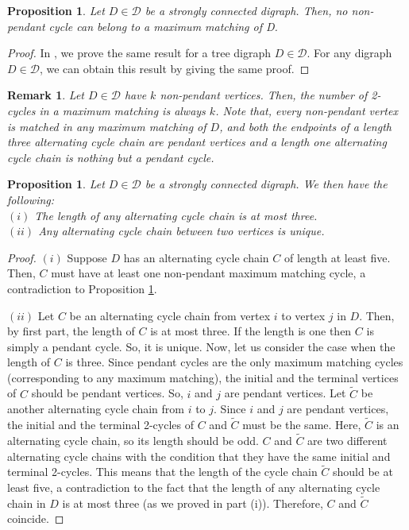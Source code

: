\documentclass[notitlepage,12pt,reqno]{amsart}
\newtheorem{prop}[thm]{Proposition}
\newtheorem{rem}[thm]{Remark}
\numberwithin{equation}{section}
\begin{document}
\begin{prop}\label{nononpendant}
Let $D\in \mathcal{D}$ be a strongly connected digraph. Then, no non-pendant cycle can belong to a maximum matching of D.
\end{prop}
\begin{proof}
In \cite[Proposition 2.2]{nandi}, we prove the same result for a tree digraph $D\in \mathcal{D}$. For any digraph $D\in \mathcal{D}$, we can obtain this result by giving the same proof.
\end{proof}
\begin{rem}\label{properties}
Let $D\in \mathcal{D}$ have $k$ non-pendant vertices. Then, the number of 2-cycles in a maximum matching is always $k$. Note that, every non-pendant vertex is matched in any maximum matching of $D$, and both the endpoints of a length three alternating cycle chain are pendant vertices and a length one alternating cycle chain is nothing but a pendant cycle.
\end{rem}
\begin{prop}\label{uniquealternating}
Let $D\in \mathcal{D}$ be a strongly connected digraph. We then have the following:\\
$(i)$ The length of any alternating cycle chain is at most three.\\
$(ii)$ Any alternating cycle chain between two vertices is unique.
\end{prop}
\begin{proof}
$(i)$ Suppose $D$ has an alternating cycle chain $C$ of length at least five. Then, $C$ must have at least one non-pendant maximum matching cycle, a contradiction to Proposition \ref{nononpendant}.

$(ii)$ Let $C$ be an alternating cycle chain from vertex $i$ to vertex $j$ in $D$. Then, by first part, the length of $C$ is at most three. If the length is one then $C$ is simply a pendant cycle. So, it is unique. Now, let us consider the case when the length of $C$ is three. Since pendant cycles are the only maximum matching cycles (corresponding to any maximum matching), the initial and the terminal vertices of $C$ should be pendant vertices. So, $i$ and $j$ are pendant vertices. Let $\tilde{C}$ be another alternating cycle chain from $i$ to $j$. Since $i$ and $j$ are pendant vertices, the initial and the terminal 2-cycles of $C$ and $\tilde{C}$ must be the same. Here, $\tilde{C}$ is an alternating cycle chain, so its length should be odd. $C$ and $\tilde{C}$ are two different alternating cycle chains with the condition that they have the same initial and terminal 2-cycles. This means that the length of the cycle chain $\tilde{C}$ should be at least five, a contradiction to the fact that the length of any alternating cycle chain in $D$ is at most three (as we proved in part (i)). Therefore, $C$ and $\tilde{C}$ coincide.
\end{proof}
\end{document}
